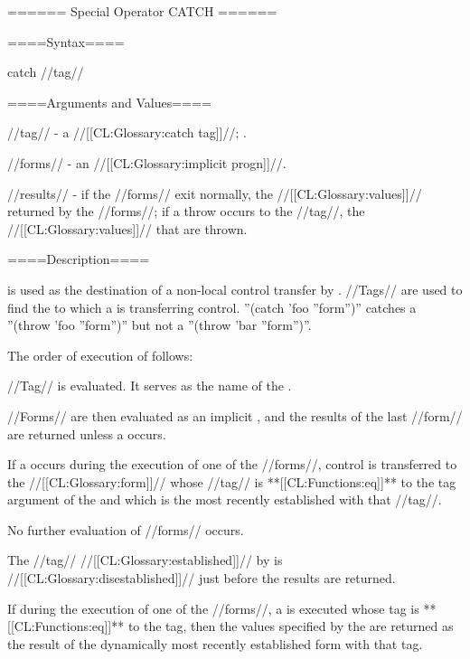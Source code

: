 ====== Special Operator CATCH ======

====Syntax====

\DefspecWithValues catch {//tag// } {}

====Arguments and Values====

//tag// - a //[[CL:Glossary:catch tag]]//; \eval.

//forms// - an //[[CL:Glossary:implicit progn]]//.

//results// - if the //forms// exit normally, the //[[CL:Glossary:values]]// returned by the //forms//; if a throw occurs to the //tag//, the //[[CL:Glossary:values]]// that are thrown.

====Description====

 is used as the destination of a non-local control transfer by . //Tags// are used to find the  to which a  is transferring control. ''(catch 'foo ''form'')'' catches a ''(throw 'foo ''form'')'' but not a ''(throw 'bar ''form'')''.

The order of execution of  follows:

\beginlist {} //Tag// is evaluated. It serves as the name of the .

 //Forms// are then evaluated as an implicit , and the results of the last //form// are returned unless a  occurs.

 If a  occurs during the execution of one of the //forms//, control is transferred to the  //[[CL:Glossary:form]]// whose //tag// is **[[CL:Functions:eq]]** to the tag argument of the  and which is the most recently established  with that //tag//.

No further evaluation of //forms// occurs.

 The //tag// //[[CL:Glossary:established]]// by  is //[[CL:Glossary:disestablished]]// just before the results are returned.

\endlist

If during the execution of one of the //forms//, a  is executed whose tag is **[[CL:Functions:eq]]** to the  tag, then the values specified by the  are returned as the result of the dynamically most recently established  form with that tag.

